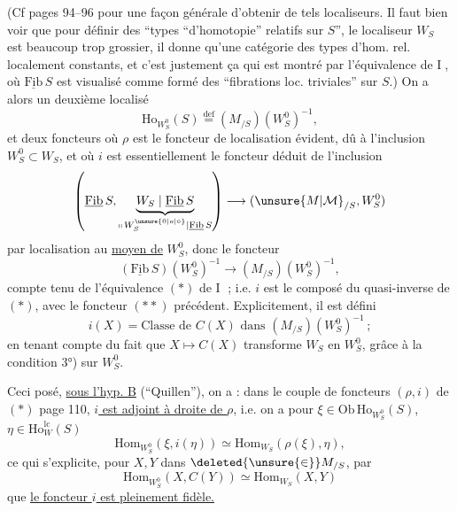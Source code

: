 (Cf pages 94--96 pour une façon générale d'obtenir de tels localiseurs. Il faut bien voir que pour définir des ``types ``d'homotopie'' relatifs sur $S$'', le localiseur $W_S$ est beaucoup trop grossier,  il  donne qu'une catégorie des types d'hom. rel. localement constants, \unsure{\})} et c'est justement ça qui est montré par  l'équivalence de \textcircled{I}, où $\underline{\mathrm{Fib}}\,S$ est visualisé comme formé des ``fibrations loc. triviales'' sur $S$.)
On a alors un deuxième localisé
\[
\mathrm{Ho}_{W_S^0}(S)\overset{\mathrm{def}}{=}(M_{/S})(W_S^0)^{-1},
\]
et deux foncteurs
où $\rho$ est le foncteur de localisation  évident, dû à l'inclusion $W_S^0\subset W_S$, et où $i$ est
essentiellement le foncteur déduit de l'inclusion
\[
\left(\underline{\mathrm{Fib}}\,S,\underbrace{W_S\mid\underline{\mathrm{Fib}}\,S}_{\shortparallel\,W_S^{\unsure{0|o|\circ}}\mid\underline{\mathrm{Fib}}\,S}\right)\longrightarrow(\unsure{M|\mathcal M}_{/S},W_S^0)
\]
par localisation au \uline{moyen de} $W_S^0$, donc le  foncteur
\[
(\underline{\mathrm{Fib}}\,S)(W_S^0)^{-1}\longrightarrow(M_{/S})(W_S^0)^{-1},\tag*{$(**)$}
\]
compte tenu de l'équivalence $(*)$ de \textcircled{I} ; i.e. $i$ est le composé du quasi-inverse de $(*)$, avec le foncteur $(**)$ précédent. Explicitement, il est défini 
\[
i(X)=\text{Classe de }C(X)\text{ dans }(M_{/S})(W_S^0)^{-1}\,;
\]
en tenant compte du fait que $X\longmapsto C(X)$ transforme $W_S$ en $W_S^0$, grâce à la condition 3°) sur $W_S^0$.

Ceci posé, \uline{sous l'hyp. B} (``Quillen''), on a : dans le couple de foncteurs $(\rho,i)$ de $(*)$ page 110, \uline{$i$ est adjoint à droite de $\rho$}, i.e. on a pour $\xi\in\mathrm{Ob}\,\mathrm{Ho}_{W_S^0}(S)$, $\eta\in\mathrm{Ho}^{\mathrm{lc}}_W(S)$
\[
\mathrm{Hom}_{W_S^0}(\xi,i(\eta))\simeq\mathrm{Hom}_{W_S}(\rho(\xi),\eta),
\]
ce qui s'explicite, pour $X,Y$ dans $\deleted{\unsure{\in}}M_{/S}$, par
\[
\boxed{\mathrm{Hom}_{W_S^0}(X,C(Y))\simeq\mathrm{Hom}_{W_S}(X,Y)}
\]
 que \uline{le foncteur $i$ est pleinement fidèle.}

